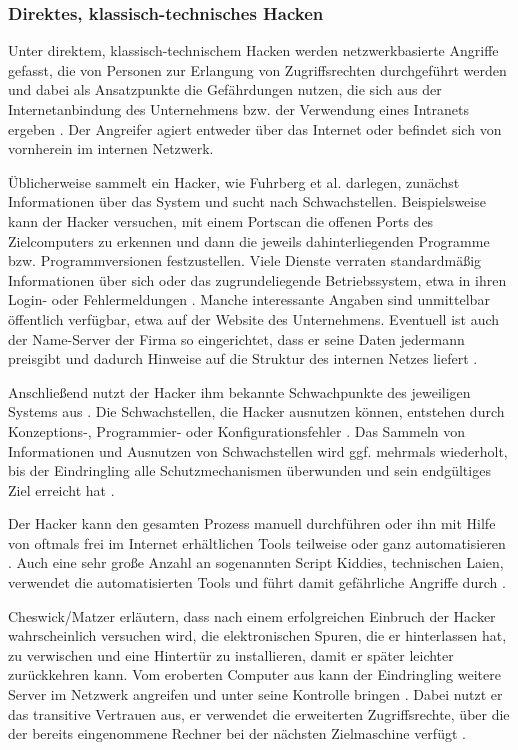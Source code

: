 \subsubsection{Direktes, klassisch-technisches Hacken}

Unter direktem, klassisch-technischem Hacken werden \va{} netzwerkbasierte Angriffe gefasst, die von Personen zur Erlangung von Zugriffsrechten durchgeführt werden und dabei als Ansatzpunkte die Gefährdungen nutzen, die sich aus der Internetanbindung des Unternehmens bzw. der Verwendung eines Intranets ergeben \cite[S. 363]{Sta01}. Der Angreifer agiert entweder über das Internet oder befindet sich von vornherein im internen Netzwerk.

Üblicherweise sammelt ein Hacker, wie Fuhrberg et al. darlegen, zunächst Informationen über das System und sucht nach Schwachstellen. Beispielsweise kann der Hacker versuchen, mit einem Portscan die offenen Ports des Zielcomputers zu erkennen und dann die jeweils dahinterliegenden Programme bzw. Programmversionen festzustellen. Viele Dienste verraten standardmäßig Informationen über sich oder das zugrundeliegende Betriebssystem, etwa in ihren Login- oder Fehlermeldungen \cite[S.~58-59]{FHW01}. Manche interessante Angaben sind unmittelbar öffentlich verfügbar, etwa auf der Website des Unternehmens. Eventuell ist auch der Name-Server der Firma so eingerichtet, dass er seine Daten jedermann preisgibt und dadurch Hinweise auf die Struktur des internen Netzes liefert \cite[S.~222]{Pip00}. 

Anschließend nutzt der Hacker ihm bekannte Schwachpunkte des jeweiligen Systems aus \cite[S.~97]{Poh01}. Die Schwachstellen, die Hacker ausnutzen können, entstehen durch Konzeptions-, Programmier- oder Konfigurationsfehler \cite[S. 48]{FHW01}. Das Sammeln von Informationen und Ausnutzen von Schwachstellen wird ggf. mehrmals wiederholt, bis der Eindringling alle Schutzmechanismen überwunden und sein endgültiges Ziel erreicht hat \cite[S.~98--99]{Rae01}.

Der Hacker kann den gesamten Prozess manuell durchführen oder ihn mit Hilfe von oftmals frei im Internet erhältlichen Tools teilweise oder ganz automatisieren \cite[S. 52-53]{SSF02}. Auch eine sehr große Anzahl an sogenannten \glqq{}Script Kiddies\grqq{}, technischen Laien, verwendet die automatisierten Tools und führt damit gefährliche Angriffe durch 
\cite[S.~82]{CoM99}.

Cheswick/Matzer erläutern, dass nach einem erfolgreichen Einbruch der Hacker wahrscheinlich versuchen wird, die elektronischen Spuren, die er hinterlassen hat, zu verwischen und eine Hintertür zu installieren, damit er später leichter zurückkehren kann. Vom eroberten Computer aus kann der Eindringling weitere Server im Netzwerk angreifen und unter seine Kontrolle bringen \cite[S.~182]{ChB99}.  Dabei nutzt er das transitive Vertrauen aus, \dH{} er verwendet die erweiterten Zugriffsrechte, über die der bereits eingenommene Rechner bei der nächsten Zielmaschine verfügt \cite[S.~14]{KSG98}. 

